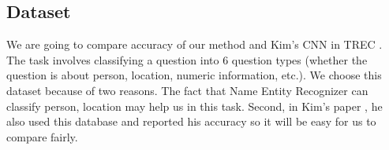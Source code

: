 \documentclass[10pt,twocolumn,letterpaper]{article}
\begin{document}
\subsection{Dataset}
We are going to compare accuracy of our method and Kim's CNN in TREC \cite{li2006learning}. The task involves classifying a question into 6 question types (whether the question is about person, location, numeric information, etc.). We choose this dataset because of two reasons. The fact that Name Entity Recognizer can classify person, location may help us in this task. Second, in Kim's paper \cite{kim2014convolutional}, he also used this database and reported his accuracy so it will be easy for us to compare fairly. 






{\small
\nocite{*}


}
\end{document}
